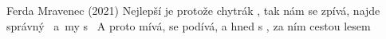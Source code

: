\begin{TEXT}{Ferda Mravenec (2021)}
\SLOKA*
Nejlepší je  protože  chytrák 
 , tak nám se 
 zpívá,  najde správný~
a~my s~
\SLOKA*
A proto  mívá,  se podívá,
a hned s , za ním  
cestou  lesem 
\end{TEXT}